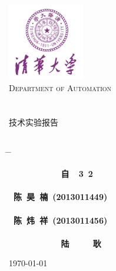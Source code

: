 


\begin{titlepage}
\begin{center}
\includegraphics[width=0.25\textwidth]{resource/logo.jpg}\\[1cm]
\textsc{\LARGE Department of Automation}\\[1.5cm]
\\[0.5cm]
\hrulefill
\\[0.8cm]{\centering \huge {}技术实验报告}\\[0.4cm]
\hrulefill
\\[4cm]

\begin{tabbing}       %

 \hspace*{5cm} \= \hspace{2.6cm} \= \kill

\>  {\centering\fs\sihao\textbf{~~~~~~~~~~~自~~3~2}} \\
\\
\>  {\centering\fs\sihao\textbf{~陈~昊~楠~(2013011449)}}\\
\\
\>  {\centering\fs\sihao\textbf{~陈~炜~祥~(2013011456)}}\\
\\
\>  {\centering\fs\sihao\textbf{~~~~~~~~~~~陆~~~~~耿}} \\

\end{tabbing}
\vfill
{\large \today}
\end{center}
\end{titlepage}

